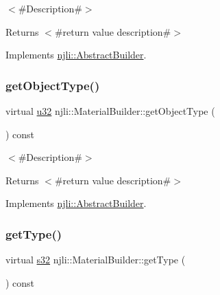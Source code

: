$<$\#\+Description\#$>$

\begin{DoxyReturn}{Returns}
$<$\#return value description\#$>$ 
\end{DoxyReturn}


Implements \mbox{\hyperlink{classnjli_1_1_abstract_builder_a902f73ea78031b06aca183a417f3413b}{njli\+::\+Abstract\+Builder}}.

\mbox{\label{classnjli_1_1_material_builder_acc744b4d414edcf669b6aacfc11573c4}} 
\subsubsection{\texorpdfstring{get\+Object\+Type()}{getObjectType()}}
{\footnotesize\ttfamily virtual \mbox{\hyperlink{_util_8h_a10e94b422ef0c20dcdec20d31a1f5049}{u32}} njli\+::\+Material\+Builder\+::get\+Object\+Type (\begin{DoxyParamCaption}{ }\end{DoxyParamCaption}) const\hspace{0.3cm}{\ttfamily [virtual]}}

$<$\#\+Description\#$>$

\begin{DoxyReturn}{Returns}
$<$\#return value description\#$>$ 
\end{DoxyReturn}


Implements \mbox{\hyperlink{classnjli_1_1_abstract_builder_a0f2d344fcf697b167f4f2b1122b5fb33}{njli\+::\+Abstract\+Builder}}.

\mbox{\label{classnjli_1_1_material_builder_aeaf990186fd43140af8263fb04518693}} 
\subsubsection{\texorpdfstring{get\+Type()}{getType()}}
{\footnotesize\ttfamily virtual \mbox{\hyperlink{_util_8h_aa62c75d314a0d1f37f79c4b73b2292e2}{s32}} njli\+::\+Material\+Builder\+::get\+Type (\begin{DoxyParamCaption}{ }\end{DoxyParamCaption}) const\hspace{0.3cm}{\ttfamily [virtual]}}

